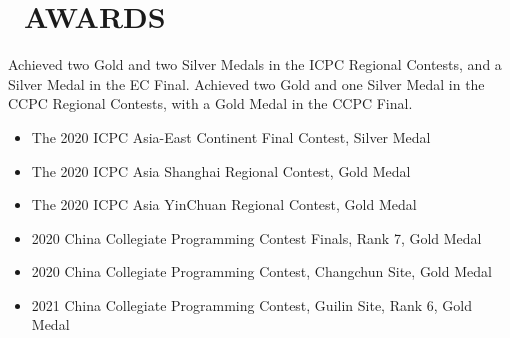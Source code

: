 \section{\faStar\ AWARDS}

Achieved two Gold and two Silver Medals in the ICPC Regional Contests, and a Silver Medal in the EC Final. 
Achieved two Gold and one Silver Medal in the CCPC Regional Contests, with a Gold Medal in the CCPC Final. 

\begin{itemize}
    \item The 2020 ICPC Asia-East Continent Final Contest, Silver Medal
    \item The 2020 ICPC Asia Shanghai Regional Contest, Gold Medal
    \item The 2020 ICPC Asia YinChuan Regional Contest, Gold Medal
    \item 2020 China Collegiate Programming Contest Finals, Rank 7, Gold Medal
    \item 2020 China Collegiate Programming Contest, Changchun Site, Gold Medal
    \item 2021 China Collegiate Programming Contest, Guilin Site, Rank 6, Gold Medal
\end{itemize}
